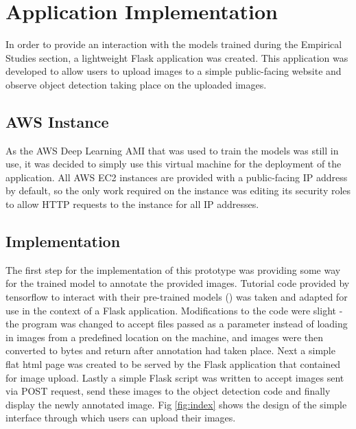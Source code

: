 \documentclass[12pt]{report}
\begin{document}
\newpage
\chapter{Application Implementation}
\begin{flushleft}
In order to provide an interaction with the models trained during the Empirical Studies section, a lightweight Flask application was created. This application was developed to allow users to upload images to a simple public-facing website and observe object detection taking place on the uploaded images.
\end{flushleft}

\section{AWS Instance}
\begin{flushleft}
As the AWS Deep Learning AMI that was used to train the models was still in use, it was decided to simply use this virtual machine for the deployment of the application. All AWS EC2 instances are provided with a public-facing IP address by default, so the only work required on the instance was editing its security roles to allow HTTP requests to the instance for all IP addresses.
\end{flushleft}

\section{Implementation}
\begin{flushleft}
The first step for the implementation of this prototype was providing some way for the trained model to annotate the provided images. Tutorial code provided by tensorflow to interact with their pre-trained models (\cite{tensorflowcode}) was taken and adapted for use in the context of a Flask application. Modifications to the code were slight - the program was changed to accept files passed as a parameter instead of loading in images from a predefined location on the machine, and images were then converted to bytes and return after annotation had taken place. Next a simple flat html page was created to be served by the Flask application that contained for image upload. Lastly a simple Flask script was written to accept images sent via POST request, send these images to the object detection code and finally display the newly annotated image. Fig \ref{fig:index} shows the design of the simple interface through which users can upload their images.
\end{flushleft}
\end{document}
